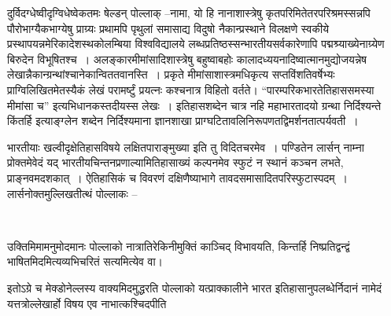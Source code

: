 दुर्विदग्धेष्वीदृग्विधेष्वेकतमः षेल्डन् पोल्लाक् –नामा, यो हि नानाशास्त्रेषु कृतपरिमितेतरपरिश्रमस्सन्नपि पौरोभाग्यैकभाग्येषु प्राग्र्यः प्रथामपि पृथुलां समासाद्य विदुषो नैकान्प्रस्थाने विलक्षणे स्वकीये प्रस्थापयन्नमेरिकादेशस्थकोलम्बिया विश्वविद्यालये लब्धप्रतिष्ठस्सन्भारतीयसर्वकारेणापि पद्मश्र्याख्येनाग्र्येण बिरुदेन विभूषितश्च~। अलङ्कारमीमांसादिशास्त्रेषु बहुष्वाबहोः कालादध्ययनादिष्वात्मानमुद्योजयन्नेष लेखान्नैकान्ग्रन्थांश्चानेकान्विततवानस्ति~। प्रकृते मीमांसाशास्त्रमधिकृत्य सप्तविंशतिवर्षेभ्यः प्राग्विलिखितमेतस्यैकं लेखं परामर्ष्टुं प्रयत्नः कश्चनात्र विहितो वर्तते। “पारम्परिकभारतेतिहाससमस्या मीमांसा च”  इत्यभिधानकस्तदीयस्स लेखः~। इतिहासशब्देन चात्र नहि महाभारतादयो ग्रन्था निर्दिश्यन्ते किंतर्हि  इत्याङ्ग्लेन शब्देन निर्दिश्यमाना ज्ञानशाखा प्राग्घटितावलिनिरूपणतद्विमर्शनतात्पर्यवती~।

भारतीयाः खल्वीदृक्षेतिहासविषये लक्षितपाराङ्मुख्या इति तु विदितचरमेव~। पण्डितेन लार्सन् नाम्ना प्रोक्तमेवेदं यद् भारतीयचिन्तनप्रणाल्यामितिहासाख्यं कल्पनमेव स्फुटं न स्थानं कञ्चन लभते, प्राङ्नवमदशकात्~। ऐतिहासिकं च विवरणं दक्षिणैष्याभागे तावदसमासादितपरिस्फुटास्पदम्~। लार्सनोक्तमुल्लिखतीत्थं पोल्लाकः –

\begin{myquote}

~\hfill {}
\end{myquote}

उक्तिमिमामनुमोदमानः पोल्लाको नात्रातिरेकिनीमुक्तिं काञ्चिद् विभावयति, किन्तर्हि निष्प्रतिद्वन्द्वं भाषितमिदमित्यव्यभिचरितं सत्यमित्येव वा।

इतोऽग्रे च मेक्डोनेल्लस्य वाक्यमिदमुद्धरति पोल्लाको यत्प्राक्कालीने भारत इतिहासानुपलब्धेर्निदानं नामेदं यत्तत्रोल्लेखार्हो विषय एव नाभात्कश्चिदपीति

\begin{myquote}

~\hfill {}
\end{myquote}

